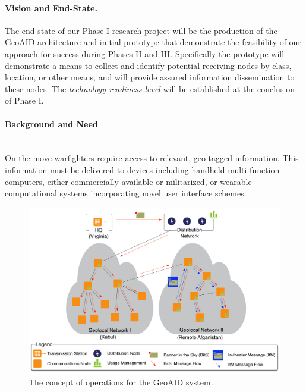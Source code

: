 \documentclass{sbir}
\begin{document}

\paragraph{Vision and End-State.} The end state of our Phase I research project will be the production of the GeoAID architecture and initial prototype that demonstrate the feasibility of our approach for success during Phases II and III. Specifically the prototype will demonstrate a means to collect and identify potential receiving nodes by class, location, or other means, and will provide assured information dissemination to these nodes. The \emph{technology readiness level} will be established at the conclusion of Phase I.

\paragraph{Background and Need}~\\
On the move warfighters require access to relevant, geo-tagged information. This information must be delivered to devices including handheld multi-function computers, either commercially available or militarized, or wearable computational systems incorporating novel user interface schemes.

\begin{figure}
\vspace{-0.2in}
  \centerline{\includegraphics[width=5in]{./images/conops-gatsid.pdf}}
    \vspace{-0.1in}
  \caption{The concept of operations for the GeoAID system.}
  \label{conops}
\end{figure}
\end{document}

